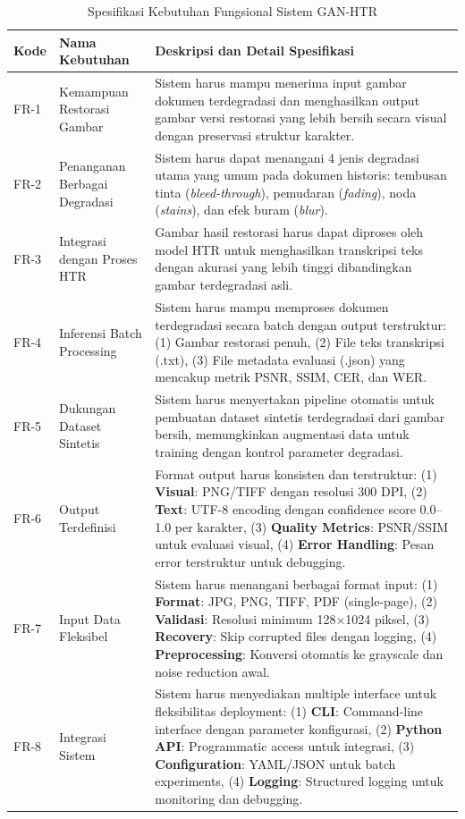 \documentclass[12pt,a4paper]{book}
\begin{document}
\begin{table}[htbp!]
\centering
\small
\caption{Spesifikasi Kebutuhan Fungsional Sistem GAN-HTR}
\label{tab:functional_requirements}
\begin{tabular}{p{}p{}p{}}
\toprule
\textbf{Kode} & \textbf{Nama Kebutuhan} & \textbf{Deskripsi dan Detail Spesifikasi} \\
\midrule
FR-1 & Kemampuan Restorasi Gambar & Sistem harus mampu menerima input gambar dokumen terdegradasi dan menghasilkan output gambar versi restorasi yang lebih bersih secara visual dengan preservasi struktur karakter. \\
\midrule
FR-2 & Penanganan Berbagai Degradasi & Sistem harus dapat menangani 4 jenis degradasi utama yang umum pada dokumen historis: tembusan tinta (\textit{bleed-through}), pemudaran (\textit{fading}), noda (\textit{stains}), dan efek buram (\textit{blur}). \\
\midrule
FR-3 & Integrasi dengan Proses HTR & Gambar hasil restorasi harus dapat diproses oleh model HTR untuk menghasilkan transkripsi teks dengan akurasi yang lebih tinggi dibandingkan gambar terdegradasi asli. \\
\midrule
FR-4 & Inferensi Batch Processing & Sistem harus mampu memproses dokumen terdegradasi secara batch dengan output terstruktur: (1) Gambar restorasi penuh, (2) File teks transkripsi (.txt), (3) File metadata evaluasi (.json) yang mencakup metrik PSNR, SSIM, CER, dan WER. \\
\midrule
FR-5 & Dukungan Dataset Sintetis & Sistem harus menyertakan pipeline otomatis untuk pembuatan dataset sintetis terdegradasi dari gambar bersih, memungkinkan augmentasi data untuk training dengan kontrol parameter degradasi. \\
\midrule
FR-6 & Output Terdefinisi & Format output harus konsisten dan terstruktur: (1) \textbf{Visual}: PNG/TIFF dengan resolusi 300 DPI, (2) \textbf{Text}: UTF-8 encoding dengan confidence score 0.0--1.0 per karakter, (3) \textbf{Quality Metrics}: PSNR/SSIM untuk evaluasi visual, (4) \textbf{Error Handling}: Pesan error terstruktur untuk debugging. \\
\midrule
FR-7 & Input Data Fleksibel & Sistem harus menangani berbagai format input: (1) \textbf{Format}: JPG, PNG, TIFF, PDF (single-page), (2) \textbf{Validasi}: Resolusi minimum 128×1024 piksel, (3) \textbf{Recovery}: Skip corrupted files dengan logging, (4) \textbf{Preprocessing}: Konversi otomatis ke grayscale dan noise reduction awal. \\
\midrule
FR-8 & Integrasi Sistem & Sistem harus menyediakan multiple interface untuk fleksibilitas deployment: (1) \textbf{CLI}: Command-line interface dengan parameter konfigurasi, (2) \textbf{Python API}: Programmatic access untuk integrasi, (3) \textbf{Configuration}: YAML/JSON untuk batch experiments, (4) \textbf{Logging}: Structured logging untuk monitoring dan debugging. \\
\bottomrule
\end{tabular}
\end{table}
\end{document}
